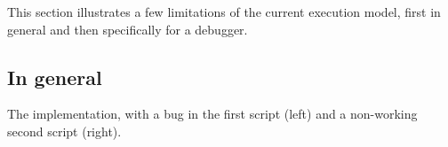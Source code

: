 \documentclass[../main]{subfiles}
\begin{document}
This section illustrates a few limitations of the current execution model, first in general and then specifically for a debugger.

\subsection{In general}\label{subsec:in-general}

\begin{listing}
    \centering
    \begin{scratch}[scale=0.6]
    \end{scratch}
    \hspace{3em}
    \begin{scratch}[scale=0.6]
    \end{scratch}
    \caption{The implementation, with a bug in the first script (left) and a non-working second script (right).}
    \label{lst:star-model-implementation}
\end{listing}
\end{document}
